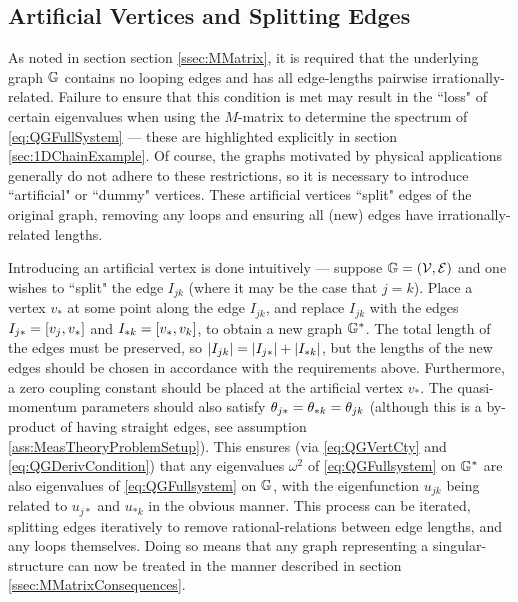 \subsection{Artificial Vertices and Splitting Edges} \label{ssec:ArtificialVertices}
As noted in section section \ref{ssec:MMatrix}, it is required that the underlying graph $\mathbb{G}$ contains no looping edges and has all edge-lengths pairwise irrationally-related.
Failure to ensure that this condition is met may result in the ``loss" of certain eigenvalues when using the $M$-matrix to determine the spectrum of \eqref{eq:QGFullSystem} --- these are highlighted explicitly in section \ref{sec:1DChainExample}.
Of course, the graphs motivated by physical applications generally do not adhere to these restrictions, so it is necessary to introduce ``artificial" or ``dummy" vertices.
These artificial vertices ``split" edges of the original graph, removing any loops and ensuring all (new) edges have irrationally-related lengths.

Introducing an artificial vertex is done intuitively --- suppose $\mathbb{G}=\left( \mathcal{V}, \mathcal{E} \right)$ and one wishes to ``split" the edge $I_{jk}$ (where it may be the case that $j=k$).
Place a vertex $v_*$ at some point along the edge $I_{jk}$, and replace $I_{jk}$ with the edges $I_{j*}=\left[ v_j, v_* \right]$ and $I_{*k}=\left[ v_*,v_k \right]$, to obtain a new graph $\mathbb{G}^*$.
The total length of the edges must be preserved, so $\left\lvert I_{jk} \right\rvert = \left\lvert I_{j*} \right\rvert+\left\lvert I_{*k} \right\rvert$, but the lengths of the new edges should be chosen in accordance with the requirements above.
Furthermore, a zero coupling constant should be placed at the artificial vertex $v_*$.
The quasi-momentum parameters should also satisfy $\theta_{j*}=\theta_{*k}=\theta_{jk}$ (although this is a by-product of having straight edges, see assumption \ref{ass:MeasTheoryProblemSetup}).
This ensures (via \eqref{eq:QGVertCty} and \eqref{eq:QGDerivCondition}) that any eigenvalues $\omega^2$ of \eqref{eq:QGFullsystem} on $\mathbb{G}^*$ are also eigenvalues of \eqref{eq:QGFullsystem} on $\mathbb{G}$, with the eigenfunction $u_{jk}$ being related to $u_{j*}$ and $u_{*k}$ in the obvious manner.
This process can be iterated, splitting edges iteratively to remove rational-relations between edge lengths, and any loops themselves.
Doing so means that any graph representing a singular-structure can now be treated in the manner described in section \ref{ssec:MMatrixConsequences}.

